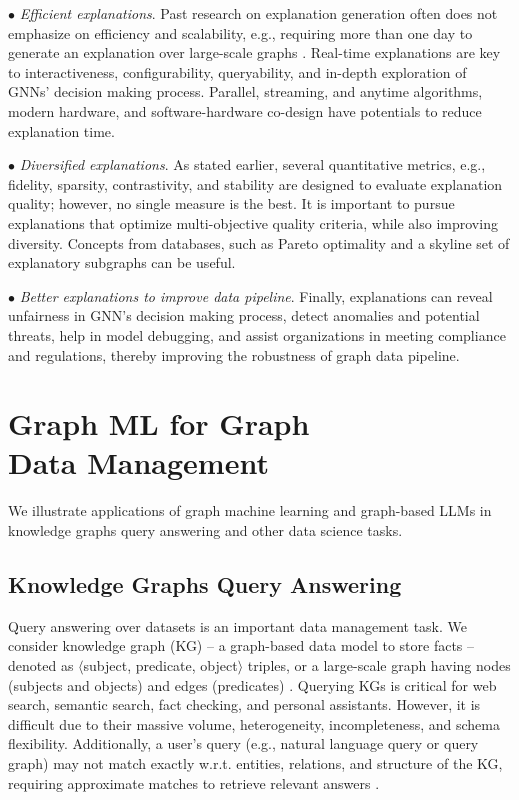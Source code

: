 \documentclass{sig-alternate-10pt}
\begin{document}
\noindent $\bullet$ {\em Efficient explanations}. Past research on explanation generation often does not emphasize on efficiency and scalability, e.g., requiring more than one day to generate an explanation over large-scale graphs \cite{ChenQWKKG24}. Real-time explanations are key to interactiveness, configurability, queryability, and in-depth exploration of GNNs' decision making process.
Parallel, streaming, and anytime algorithms, modern hardware, and software-hardware co-design have potentials to reduce explanation time.


\noindent $\bullet$ {\em Diversified explanations}.
As stated earlier, several quantitative metrics, e.g., fidelity, sparsity, contrastivity, and stability are designed to evaluate explanation quality; however, no single measure is the best. It is important to pursue explanations that optimize
multi-objective quality criteria, while also improving diversity. Concepts from databases, such as Pareto optimality and a skyline set
of explanatory subgraphs can be useful.


\noindent $\bullet$ {\em Better explanations to improve data pipeline}.
Finally, explanations can reveal unfairness in GNN's decision making process, detect anomalies and potential threats, help in model debugging, and  assist organizations in meeting compliance and regulations, thereby improving the robustness of graph data pipeline.



\section{Graph ML for Graph \\ Data Management}
\label{sec:gml4gdm}

\medskip
\medskip

We illustrate applications of graph machine learning and graph-based LLMs in knowledge graphs
query answering and other data science tasks.

\subsection{Knowledge Graphs Query Answering}
\label{sec:kg}

\medskip
\medskip


Query answering over datasets is an important data management task. We consider knowledge graph (KG) -- a graph-based data model to store facts -- denoted as $\langle$subject, predicate, object$\rangle$ triples, or a large-scale graph having nodes (subjects and objects) and edges (predicates) \cite{WeikumDRS21}. Querying KGs is critical for web search, semantic search, fact checking, and personal assistants. However, it is difficult due to their massive volume, heterogeneity, incompleteness, and schema flexibility. Additionally, a user's query (e.g., natural language query or query graph) may not match exactly w.r.t. entities, relations, and structure of the KG, requiring approximate matches to retrieve relevant answers \cite{Khan23}.
\end{document}
